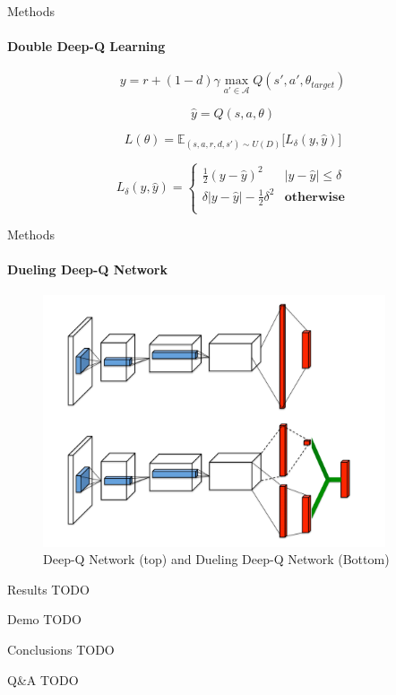 \documentclass{beamer}
\begin{document}
\begin{frame}{Methods}
\framesubtitle{Double Deep-Q Learning}

\begin{equation}
y = r + (1 - d) \gamma \max_{a' \in \mathcal{A}} Q(s', a', \theta_{target})
\end{equation}

\begin{equation}
\hat{y} = Q(s, a, \theta)
\end{equation}

\begin{equation}
L(\theta) =
\mathbb{E}_{(s, a, r, d, s') \sim U(D)} \bigg[ L_{\delta}(y, \hat{y}) \bigg]
\label{eqn:deep-q-alg}
\end{equation}

\begin{equation}
L_{\delta}(y, \hat{y}) = \begin{cases}
      \frac{1}{2} (y - \hat{y})^2                & |y - \hat{y}| \leq \delta \\
      \delta |y - \hat{y}| - \frac{1}{2}\delta^2 & \textbf{otherwise} \\
\end{cases}
\label{eqn:huber}
\end{equation}

\end{frame}



\begin{frame}{Methods}
\framesubtitle{Dueling Deep-Q Network}
\begin{figure}
\includegraphics[width=0.9\textwidth]{img/dueling-deep-q}
\caption*{Deep-Q Network (top) and Dueling Deep-Q Network (Bottom)}
\end{figure}
\end{frame}



\begin{frame}{Results}
TODO
\end{frame}

\begin{frame}{Demo}
TODO
\end{frame}

\begin{frame}{Conclusions}
TODO
\end{frame}

\begin{frame}{Q\&A}
TODO
\end{frame}
\end{document}
